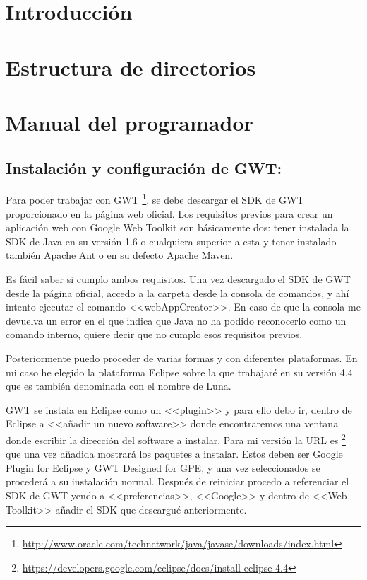 
\section{Introducción}


\section{Estructura de directorios}

\section{Manual del programador}


\subsection{Instalación y configuración de GWT:}


Para poder trabajar con GWT \footnote{\url{http://www.oracle.com/technetwork/java/javase/downloads/index.html}}, se debe descargar el SDK de GWT proporcionado en la página web oficial. Los requisitos previos para crear un aplicación web con Google Web Toolkit son básicamente dos: tener instalada la SDK de Java en su versión 1.6 o cualquiera superior a esta y tener instalado también Apache Ant o en su defecto Apache Maven.

Es fácil saber si cumplo ambos requisitos. Una vez descargado el SDK de GWT desde la página oficial, accedo a la carpeta desde la consola de comandos, y ahí intento ejecutar el comando <<webAppCreator>>. En caso de que la consola me devuelva un error en el que indica que Java no ha podido reconocerlo como un comando interno, quiere decir que no cumplo esos requisitos previos.

Posteriormente puedo proceder de varias formas y con diferentes plataformas.
En mi caso he elegido la plataforma Eclipse sobre la que trabajaré en su
versión 4.4 que es también denominada  con el nombre de Luna.

GWT se instala en Eclipse como un <<plugin>> y para ello debo ir, dentro de Eclipse a <<añadir un nuevo software>> donde encontraremos una ventana donde escribir la dirección del software a instalar. Para mi versión la URL es \footnote{\url{https://developers.google.com/eclipse/docs/install-eclipse-4.4}} que una vez añadida mostrará los paquetes a instalar. Estos deben ser Google Plugin for Eclipse y GWT Designed for GPE, y una vez seleccionados se procederá a su instalación normal. Después de reiniciar procedo a referenciar el SDK de GWT yendo a <<preferencias>>, <<Google>> y dentro de <<Web Toolkit>> añadir el SDK que descargué anteriormente. 

